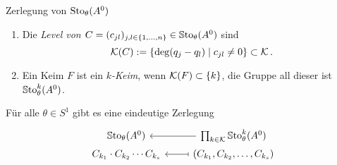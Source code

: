 \begin{frame}[fragile]{Zerlegung von $\operatorname{Sto}_\theta(A^0)$}
  \begin{defn}
    \begin{enumerate}[<+->]
    \item Die \emph{Level von
        \boldmath$C=(c_{jl})_{j,l\in\{1,\dots,n\}}\in\operatorname{\mathbb{S}to}_\theta(A^0)$} sind
      \[
        \mathcal{K}(C):= \left\{\deg(q_j-q_l)\mid c_{jl}\neq0\right\} \subset \mathcal{K} \,.
      \]
    \item Ein Keim $F$ ist ein \emph{\boldmath$k$-Keim}, wenn
      $\mathcal{K}(F)\subset\{k\}$, die Gruppe all dieser ist $\operatorname{\mathbb{S}to}_\theta^k(A^0)$.
    \end{enumerate}
  \end{defn}
  \begin{thm}
    Für alle $\theta\in S^1$ gibt es eine eindeutige Zerlegung
    \[ \begin{tikzcd}[row sep=0cm]
        \SSto_\theta(A^0)
        & \prod_{k\in\cK}\SSto_\theta^k(A^0) \lar
        \\ C_{k_1}\cdot C_{k_2}\cdots C_{k_s}
        & \left(C_{k_1}, C_{k_2},\dots, C_{k_s}\right) \lar[maps to]
      \end{tikzcd} \]
  \end{thm}
\end{frame}

